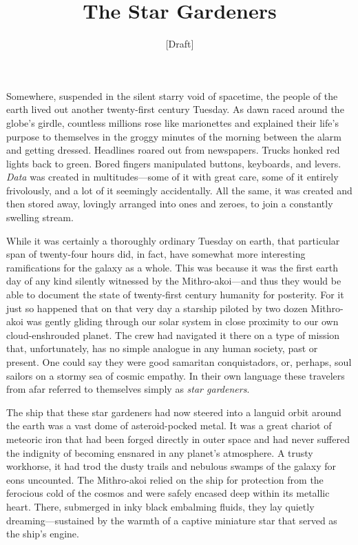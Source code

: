 \documentclass[12pt]{article}
\title{The Star Gardeners}
\author{[Draft]}
\begin{document}
\maketitle

Somewhere,
suspended in the silent starry void of spacetime,
the people of the earth lived out another twenty-first century Tuesday.
As dawn raced around the globe's girdle,
countless millions rose like marionettes
and explained their life's purpose to themselves in the groggy minutes of the morning between the alarm and getting dressed.
Headlines roared out from newspapers.
Trucks honked red lights back to green.
Bored fingers manipulated buttons, keyboards, and levers.
\textit{Data} was created in multitudes---some of it with great care,
some of it entirely frivolously,
and a lot of it seemingly accidentally.
All the same, it was created and then stored away,
lovingly arranged into ones and zeroes, to join a constantly swelling stream.

While it was certainly a thoroughly ordinary Tuesday on earth,
that particular span of twenty-four hours did, in fact, have somewhat more interesting ramifications for the galaxy as a whole.
This was because it was the first earth day of any kind silently witnessed by the Mithro-akoi---and thus they would be able to document the state of twenty-first century humanity for posterity.
For it just so happened that on that very day a starship piloted by two dozen Mithro-akoi was gently gliding through our solar system in close proximity to our own cloud-enshrouded planet.
The crew had navigated it there on a type of mission that, unfortunately, has no simple analogue in any human society, past or present.
One could say they were good samaritan conquistadors,
or, perhaps, soul sailors on a stormy sea of cosmic empathy.
In their own language these travelers from afar referred to themselves simply as \textit{star gardeners}.

The ship that these star gardeners had now steered into a languid orbit around the earth was a vast dome of asteroid-pocked metal.
It was a great chariot of meteoric iron that had been forged directly in outer space 
and had never suffered the indignity of becoming ensnared in any planet's atmosphere.
A trusty workhorse,
it had trod the dusty trails and nebulous swamps of the galaxy for eons uncounted.
The Mithro-akoi relied on the ship for protection from the ferocious cold of the cosmos and were safely encased deep within its metallic heart.
There,
submerged in inky black embalming fluids, they lay quietly dreaming---sustained by the warmth of a captive miniature star that served as the ship's engine.
\end{document}
